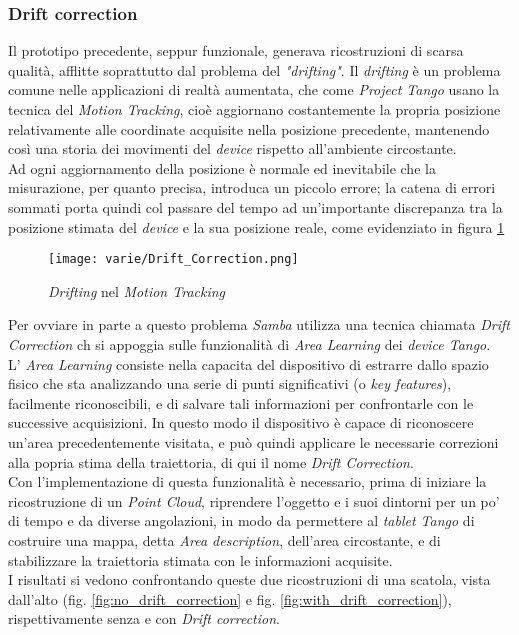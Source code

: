 \subsubsection{Drift correction}
Il prototipo precedente, seppur funzionale, generava ricostruzioni di scarsa qualità, afflitte soprattutto dal problema del \emph{"drifting"}. Il \emph{drifting} è un problema comune nelle applicazioni di realtà aumentata, che come \emph{Project Tango} usano la tecnica del \emph{Motion Tracking}, cioè aggiornano costantemente la propria posizione relativamente alle coordinate acquisite nella posizione precedente, mantenendo così una storia dei movimenti del \emph{device} rispetto all'ambiente circostante.\\
Ad ogni aggiornamento della posizione è normale ed inevitabile che la misurazione, per quanto precisa, introduca un piccolo errore; la catena di errori sommati porta quindi col passare del tempo ad un'importante discrepanza tra la posizione stimata del \emph{device} e la sua posizione reale, come evidenziato in figura \ref{fig:drift_correction}
\begin{figure}[!h] 
    \centering 
    \texttt{[image: varie/Drift\_Correction.png]} 
    \caption{\emph{Drifting} nel \emph{Motion Tracking}}
    \label{fig:drift_correction}
\end{figure}
Per ovviare in parte a questo problema \emph{Samba} utilizza una tecnica chiamata \emph{Drift Correction} ch si appoggia sulle funzionalità di \emph{Area Learning} dei \emph{device Tango}.\\
L' \emph{Area Learning} consiste nella capacita del dispositivo di estrarre dallo spazio fisico che sta analizzando una serie di punti significativi (o \emph{key features}), facilmente riconoscibili, e di salvare tali informazioni per confrontarle con le successive acquisizioni. In questo modo il dispositivo è capace di riconoscere un'area precedentemente visitata, e può quindi applicare le necessarie correzioni alla popria stima della traiettoria, di qui il nome \emph{Drift Correction}.\\
Con l'implementazione di questa funzionalità è necessario, prima di iniziare la ricostruzione di un \emph{Point Cloud}, riprendere l'oggetto e i suoi dintorni per un po' di tempo e da diverse angolazioni, in modo da permettere al \emph{tablet Tango} di costruire una mappa, detta \emph{Area description}, dell'area circostante, e di stabilizzare la traiettoria stimata con le informazioni acquisite.\\
I risultati si vedono confrontando queste due ricostruzioni di una scatola, vista dall'alto (fig. \ref{fig:no_drift_correction} e fig. \ref{fig:with_drift_correction}), rispettivamente senza e con \emph{Drift correction}.
